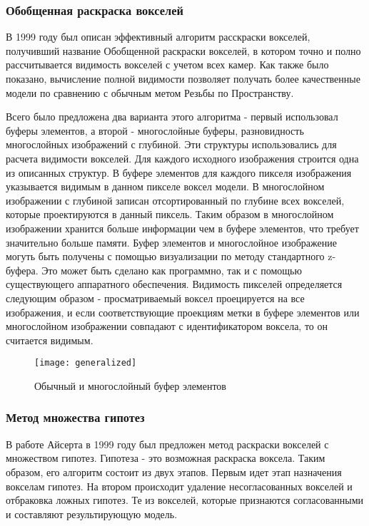 \subsubsection{Обобщенная раскраска вокселей}
В 1999 году был описан эффективный алгоритм расскраски вокселей, получивший название Обобщенной раскраски вокселей, в котором точно и полно рассчитывается видимость вокселей с учетом всех камер. Как также было показано, вычисление полной видимости позволяет получать более качественные модели по сравнению с обычным метом Резьбы по Пространству.

Всего было предложена два варианта этого алгоритма - первый использовал буферы элементов, а второй - многослойные буферы, разновидность многослойных изображений с глубиной. Эти структуры использовались для расчета видимости вокселей. Для каждого исходного изображения строится одна из описанных структур. В буфере элементов для каждого пикселя изображения указывается видимым в данном пикселе воксел модели. В многослойном изображении с глубиной записан отсортированный по глубине всех вокселей, которые проектируются в данный пиксель. Таким образом в многослойном изображении хранится больше информации чем в буфере элементов, что требует значительно больше памяти. Буфер элементов и многослойное изображение могуть быть получены с помощью визуализации по методу стандартного z-буфера. Это может быть сделано как программно, так и с помощью существующего аппаратного обеспечения. Видимость пикселей определяется следующим образом - просматриваемый воксел проецируется на все изображения, и если соответствующие проекциям метки в буфере элементов или многослойном изображении совпадают с идентификатором воксела, то он считается видимым.
\begin{figure}[h]
\center
\texttt{[image: generalized]}
\caption{Обычный и многослойный буфер элементов}
\end{figure}

\subsubsection{Метод множества гипотез}
В работе Айсерта в 1999 году был предложен метод раскраски вокселей с множеством гипотез. Гипотеза - это возможная раскраска воксела. Таким образом, его алгоритм состоит из двух этапов. Первым идет этап назначения вокселам гипотез. На втором происходит удаление несогласованных вокселей и отбраковка ложных гипотез. Те из вокселей, которые признаются согласованными и составляют результирующую модель.

